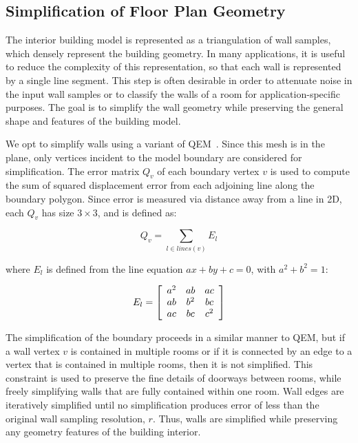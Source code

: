 \documentclass[12pt,onecolumn,oneside]{book}
\begin{document}
\subsection{Simplification of Floor Plan Geometry}
\label{ssec:fp_simplify}

The interior building model is represented as a triangulation of wall samples, which densely represent the building geometry.  In many applications, it is useful to reduce the complexity of this representation, so that each wall is represented by a single line segment.  This step is often desirable in order to attenuate noise in the input wall samples or to classify the walls of a room for application-specific purposes.  The goal is to simplify the wall geometry while preserving the general shape and features of the building model.

We opt to simplify walls using a variant of QEM~\cite{QEM,Turner14}.  Since this mesh is in the plane, only vertices incident to the model boundary are considered for simplification.  The error matrix $Q_v$ of each boundary vertex $v$ is used to compute the sum of squared displacement error from each adjoining line along the boundary polygon.  Since error is measured via distance away from a line in 2D, each $Q_v$ has size $3 \times 3$, and is defined as:

\begin{equation}
Q_v = \sum_{l \in lines(v)} E_l
\end{equation}

where $E_l$ is defined from the line equation $ax + by + c = 0$, with $a^2 + b^2 = 1$:

\begin{equation}
E_l = \left[ \begin{array}{c c c}
a^2 & ab & ac \\
ab & b^2 & bc \\
ac & bc & c^2 \end{array} \right]
\end{equation}

The simplification of the boundary proceeds in a similar manner to QEM, but if a wall vertex $v$ is contained in multiple rooms or if it is connected by an edge to a vertex that is contained in multiple rooms, then it is not simplified.  This constraint is used to preserve the fine details of doorways between rooms, while freely simplifying walls that are fully contained within one room.  Wall edges are iteratively simplified until no simplification produces error of less than the original wall sampling resolution, $r$.  Thus, walls are simplified while preserving any geometry features of the building interior.
\end{document}
